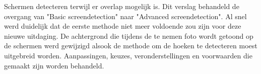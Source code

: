 Schermen detecteren terwijl er overlap mogelijk is. Dit verslag behandeld de overgang van "Basic screendetection"  naar "Advanced screendetection". Al snel werd duidelijk dat de eerste methode niet meer voldoende zou zijn voor deze nieuwe uitdaging. De achtergrond die tijdens de te nemen foto wordt getoond op de schermen werd gewijzigd alsook de methode om de hoeken te detecteren moest uitgebreid worden. Aanpassingen, keuzes, veronderstellingen en voorwaarden die gemaakt zijn worden behandeld.
